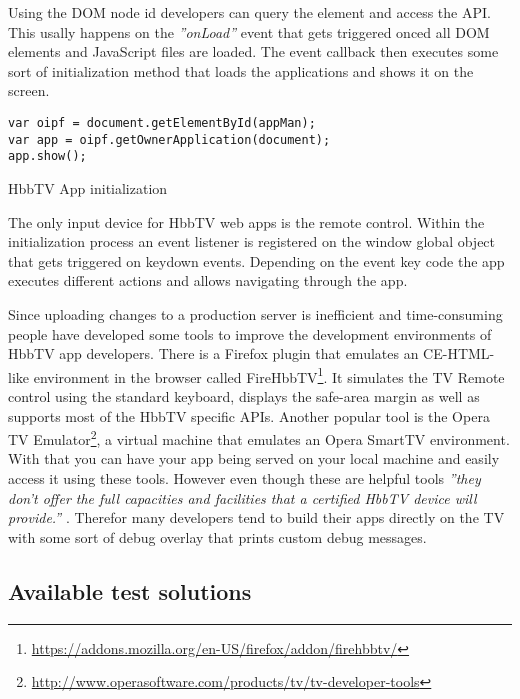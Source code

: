 Using the DOM node id developers can query the element and access the API. This usally happens on the \textit{''onLoad''} event that gets triggered onced all DOM elements and JavaScript files are loaded. The event callback then executes some sort of initialization method that loads the applications and shows it on the screen.

\vspace{1cm}
\begin{listing}[H]
\begin{verbatim}
var oipf = document.getElementById(appMan);
var app = oipf.getOwnerApplication(document);
app.show();
\end{verbatim}
\caption{HbbTV App initialization}
\label{lst:loadApp}
\end{listing}
\vspace{0.5cm}

The only input device for HbbTV web apps is the remote control. Within the initialization process an event listener is registered on the window global object that gets triggered on keydown events. Depending on the event key code the app executes different actions and allows navigating through the app.

Since uploading changes to a production server is inefficient and time-consuming people have developed some tools to improve the development environments of HbbTV app developers. There is a Firefox plugin that emulates an CE-HTML-like environment in the browser called FireHbbTV\footnote{\url{https://addons.mozilla.org/en-US/firefox/addon/firehbbtv/}}. It simulates the TV Remote control using the standard keyboard, displays the safe-area margin as well as supports most of the HbbTV specific APIs. Another popular tool is the Opera TV Emulator\footnote{\url{http://www.operasoftware.com/products/tv/tv-developer-tools}}, a virtual machine that emulates an Opera SmartTV environment. With that you can have your app being served on your local machine and easily access it using these tools. However even though these are helpful tools \textit{''they don't offer the full capacities and facilities that a certified HbbTV device will provide.''} \cite{hbbtvenv}. Therefor many developers tend to build their apps directly on the TV with some sort of debug overlay that prints custom debug messages.

\subsection{Available test solutions\label{sec:availabletestsolutions}}


